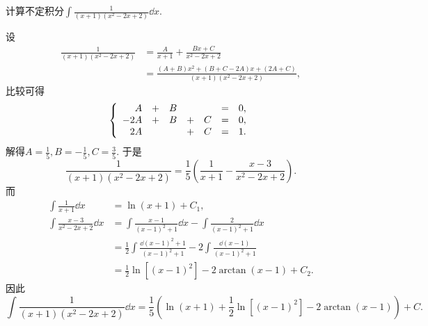 \begin{example}
计算不定积分\(\int \frac1{(x+1)(x^2-2x+2)} \dd{x}\).
\begin{solution}
设\begin{align*}
	\frac1{(x+1)(x^2-2x+2)}
	&= \frac{A}{x+1} + \frac{Bx+C}{x^2-2x+2} \\
	&= \frac{(A+B)x^2+(B+C-2A)x+(2A+C)}{(x+1)(x^2-2x+2)},
\end{align*}
比较可得\begin{equation*}
	\left\{ \begin{array}{*7r}
		A &+& B && &=& 0, \\
		-2A &+& B &+& C &=& 0, \\
		2A && &+& C &=& 1.
	\end{array} \right.
\end{equation*}
解得\(A=\frac15,
B=-\frac15,
C=\frac35\).
于是\begin{equation*}
	\frac1{(x+1)(x^2-2x+2)}
	= \frac15 \left( \frac1{x+1} - \frac{x-3}{x^2-2x+2} \right).
\end{equation*}
而\begin{align*}
	\int \frac1{x+1} \dd{x}
	&= \ln(x+1) + C_1, \\
	\int \frac{x-3}{x^2-2x+2} \dd{x}
	&= \int \frac{x-1}{(x-1)^2+1} \dd{x}
	- \int \frac{2}{(x-1)^2+1} \dd{x} \\
	&= \frac12 \int \frac{\dd{(x-1)^2+1}}{(x-1)^2+1}
	- 2 \int \frac{\dd{(x-1)}}{(x-1)^2+1} \\
	&= \frac12 \ln[(x-1)^2]
	- 2 \arctan(x-1) + C_2.
\end{align*}
因此\begin{equation*}
	\int \frac1{(x+1)(x^2-2x+2)} \dd{x}
	= \frac15 \left(
		\ln(x+1) + \frac12 \ln[(x-1)^2] - 2 \arctan(x-1)
	\right) + C.
\end{equation*}
\end{solution}
\end{example}
